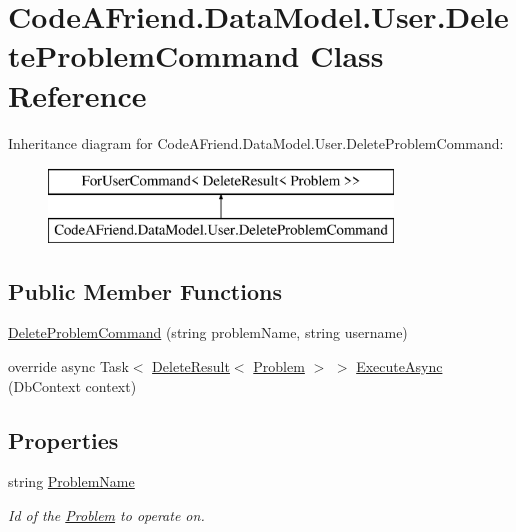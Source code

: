 \hypertarget{class_code_a_friend_1_1_data_model_1_1_user_1_1_delete_problem_command}{}\section{Code\+A\+Friend.\+Data\+Model.\+User.\+Delete\+Problem\+Command Class Reference}
\label{class_code_a_friend_1_1_data_model_1_1_user_1_1_delete_problem_command}


 


Inheritance diagram for Code\+A\+Friend.\+Data\+Model.\+User.\+Delete\+Problem\+Command\+:\begin{figure}[H]
\begin{center}
\leavevmode
\includegraphics[height=2.000000cm]{class_code_a_friend_1_1_data_model_1_1_user_1_1_delete_problem_command}
\end{center}
\end{figure}
\subsection*{Public Member Functions}
\begin{DoxyCompactItemize}
\item 
\mbox{\hyperlink{class_code_a_friend_1_1_data_model_1_1_user_1_1_delete_problem_command_addb77111dd39c6d3baad2cf35dd308dd}{Delete\+Problem\+Command}} (string problem\+Name, string username)
\item 
override async Task$<$ \mbox{\hyperlink{class_code_a_friend_1_1_data_model_1_1_delete_result}{Delete\+Result}}$<$ \mbox{\hyperlink{class_code_a_friend_1_1_data_model_1_1_problem}{Problem}} $>$ $>$ \mbox{\hyperlink{class_code_a_friend_1_1_data_model_1_1_user_1_1_delete_problem_command_a5da058a13bbaad9487f34c3e16d347c9}{Execute\+Async}} (Db\+Context context)
\end{DoxyCompactItemize}
\subsection*{Properties}
\begin{DoxyCompactItemize}
\item 
string \mbox{\hyperlink{class_code_a_friend_1_1_data_model_1_1_user_1_1_delete_problem_command_a220adc216f07aeed2119eb4dc946de21}{Problem\+Name}}
\begin{DoxyCompactList}\small\item\em Id of the \mbox{\hyperlink{class_code_a_friend_1_1_data_model_1_1_problem}{Problem}} to operate on.\end{DoxyCompactList}\end{DoxyCompactItemize}


